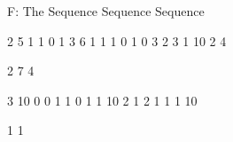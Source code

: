 \begin{problem}{F: The Sequence Sequence Sequence}

\end{problem}

\begin{formalin}
\end{formalin}

\begin{formalout}
\end{formalout}

\begin{datain}
2 5
1 1 0 1
3 6
1 1 1 0 1 0
3
2 3
1 10
2 4
\end{datain}
\begin{dataout}
2
7
4
\end{dataout}

\begin{datain}
3 10
0 0 1 1 0 1
1 10
2 1
2
1 1
1 10
\end{datain}
\begin{dataout}
1
1
\end{dataout}
